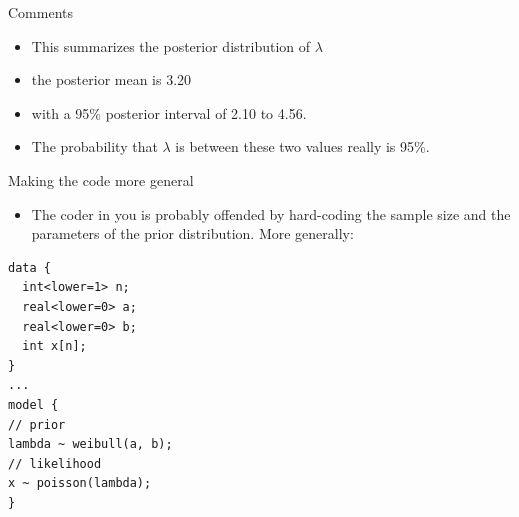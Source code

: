 \documentclass[
  ignorenonframetext,
]{beamer}
\providecommand{\tightlist}{%
  \setlength{\itemsep}{0pt}\setlength{\parskip}{0pt}}
\begin{document}
\begin{frame}{Comments}
\protect\hypertarget{comments-29}{}

\begin{itemize}
\tightlist
\item
  This summarizes the posterior distribution of \(\lambda\)
\item
  the posterior mean is 3.20
\item
  with a 95\% posterior interval of 2.10 to 4.56.
\item
  The probability that \(\lambda\) is between these two values really is
  95\%.
\end{itemize}

\end{frame}

\begin{frame}[fragile]{Making the code more general}
\protect\hypertarget{making-the-code-more-general}{}

\begin{itemize}
\tightlist
\item
  The coder in you is probably offended by hard-coding the sample size
  and the parameters of the prior distribution. More generally:
\end{itemize}

\begin{verbatim}
data {
  int<lower=1> n;
  real<lower=0> a;
  real<lower=0> b;
  int x[n];
}
...
model {
// prior
lambda ~ weibull(a, b);
// likelihood
x ~ poisson(lambda);
}
\end{verbatim}

\end{frame}
\end{document}
